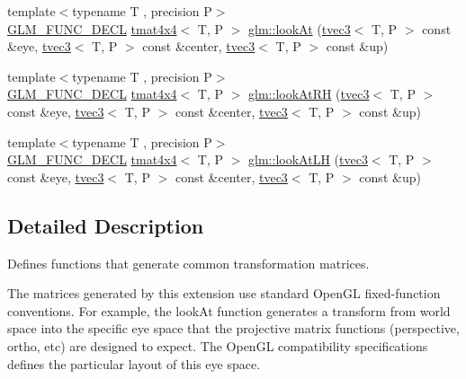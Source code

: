 \begin{DoxyCompactItemize}
\item 
{\footnotesize template$<$typename T , precision P$>$ }\\\mbox{\hyperlink{setup_8hpp_ab2d052de21a70539923e9bcbf6e83a51}{G\+L\+M\+\_\+\+F\+U\+N\+C\+\_\+\+D\+E\+CL}} \mbox{\hyperlink{structglm_1_1tmat4x4}{tmat4x4}}$<$ T, P $>$ \mbox{\hyperlink{group__gtc__matrix__transform_gaf8eef81da1ad09f6a8920101c01eaae4}{glm\+::look\+At}} (\mbox{\hyperlink{structglm_1_1tvec3}{tvec3}}$<$ T, P $>$ const \&eye, \mbox{\hyperlink{structglm_1_1tvec3}{tvec3}}$<$ T, P $>$ const \&center, \mbox{\hyperlink{structglm_1_1tvec3}{tvec3}}$<$ T, P $>$ const \&up)
\item 
{\footnotesize template$<$typename T , precision P$>$ }\\\mbox{\hyperlink{setup_8hpp_ab2d052de21a70539923e9bcbf6e83a51}{G\+L\+M\+\_\+\+F\+U\+N\+C\+\_\+\+D\+E\+CL}} \mbox{\hyperlink{structglm_1_1tmat4x4}{tmat4x4}}$<$ T, P $>$ \mbox{\hyperlink{group__gtc__matrix__transform_ga2876d9313334980b94292d2ec169088e}{glm\+::look\+At\+RH}} (\mbox{\hyperlink{structglm_1_1tvec3}{tvec3}}$<$ T, P $>$ const \&eye, \mbox{\hyperlink{structglm_1_1tvec3}{tvec3}}$<$ T, P $>$ const \&center, \mbox{\hyperlink{structglm_1_1tvec3}{tvec3}}$<$ T, P $>$ const \&up)
\item 
{\footnotesize template$<$typename T , precision P$>$ }\\\mbox{\hyperlink{setup_8hpp_ab2d052de21a70539923e9bcbf6e83a51}{G\+L\+M\+\_\+\+F\+U\+N\+C\+\_\+\+D\+E\+CL}} \mbox{\hyperlink{structglm_1_1tmat4x4}{tmat4x4}}$<$ T, P $>$ \mbox{\hyperlink{group__gtc__matrix__transform_gacd0c077ec7b58a575855e29cb5fb586d}{glm\+::look\+At\+LH}} (\mbox{\hyperlink{structglm_1_1tvec3}{tvec3}}$<$ T, P $>$ const \&eye, \mbox{\hyperlink{structglm_1_1tvec3}{tvec3}}$<$ T, P $>$ const \&center, \mbox{\hyperlink{structglm_1_1tvec3}{tvec3}}$<$ T, P $>$ const \&up)
\end{DoxyCompactItemize}


\subsection{Detailed Description}
Defines functions that generate common transformation matrices. 

The matrices generated by this extension use standard Open\+GL fixed-\/function conventions. For example, the look\+At function generates a transform from world space into the specific eye space that the projective matrix functions (perspective, ortho, etc) are designed to expect. The Open\+GL compatibility specifications defines the particular layout of this eye space.

